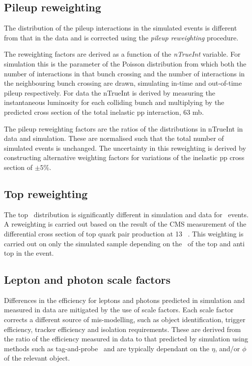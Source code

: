 \subsection{Pileup reweighting}
The distribution of the pileup interactions in the simulated events is different from
that in the data and is corrected using the \emph{pileup reweighting} procedure. 

The reweighting factors are derived as a function of the \emph{nTrueInt} variable. 
For simulation this is the parameter of the Poisson distribution from which 
both the number of interactions in that bunch crossing and the number of interactions in
the neighbouring bunch crossing are drawn, simulating in-time and out-of-time pileup
respectively. For data the nTrueInt is derived by measuring the instantaneous luminosity
for each colliding bunch and multiplying by the predicted cross section 
of the total inelastic pp interaction, 63 mb. 

The pileup reweighting factors are the ratios of the distributions in nTrueInt in data
and simulation. These are normalised such that the total number of simulated events 
is unchanged. The uncertainty in this reweighting is derived by 
constructing alternative weighting factors for variations 
of the inelastic pp cross section of $\pm5\%$.

\subsection{Top \pt reweighting}

The top \pt~distribution is significantly different in simulation and data for 
\ttbar~events. A reweighting is carried out based on the result of the CMS 
measurement of the differential cross section of top quark pair production 
at 13 \TeV~\cite{toppt}. This weighting is carried out on only the \ttbar 
simulated sample depending on the \pt~of the top and anti top in the event.

\subsection{Lepton and photon scale factors}
\label{sec:scale-factor}
Differences in the efficiency for leptons and photons predicted in 
simulation and measured in data are mitigated by the use of scale factors. 
Each scale factor corrects a different source of mis-modelling, such as 
object identification, trigger efficiency, tracker efficiency and isolation requirements.
These are derived from the ratio of the efficiency measured in data to that
predicted by simulation using methods such as tag-and-probe~\cite{MuonReco} 
and are typically dependant on the $\eta$, \pt and/or $\phi$ of the relevant object.

